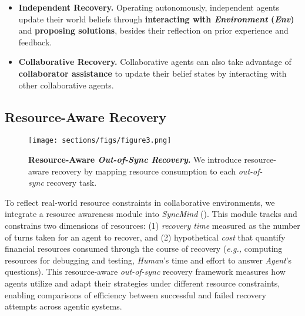 \begin{itemize}[noitemsep,topsep=0pt,parsep=2pt,partopsep=0pt,leftmargin=*]
    \item \textbf{Independent Recovery.} Operating autonomously, independent agents update their world beliefs through \textcolor{fig2_env}{\textbf{interacting with \textit{Environment} (\textit{Env})}} and  \textcolor{fig2_code}{\textbf{proposing solutions}}, besides their reflection on prior experience and feedback.
    \item \textbf{Collaborative Recovery.} Collaborative agents can also take advantage of \textcolor{fig2_ask}{\textbf{collaborator assistance}} to update their belief states by interacting with other collaborative agents. 
\end{itemize}



\subsection{Resource-Aware Recovery}
\label{Section: Resource Awareness Module}



\begin{figure}[H]
\begin{center}
\begin{small}
\vspace{-0.8em}
    \texttt{[image: sections/figs/figure3.png]}
    \vspace{-1.8em}
    \caption{\textbf{Resource-Aware \textit{Out-of-Sync Recovery}.} We introduce resource-aware recovery by mapping resource consumption to each \textit{out-of-sync} recovery task.}
    \vspace{-1.5em}
    \label{fig:figure 3 (resource awareness)}
\end{small}
\end{center}
\end{figure}



To reflect real-world resource constraints in collaborative environments, we integrate a resource awareness module into \textit{SyncMind} ().
% 
This module tracks and constrains two dimensions of resources: 
(1) \textit{recovery time} measured as the number of turns taken for an agent to recover, 
and (2) hypothetical \textit{cost} that quantify financial resources consumed through the course of recovery (\textit{e.g.,} computing resources for debugging and testing, \textcolor{fig1_human}{\textit{Human}}'s time and effort to answer \textcolor{fig1_agent}{\textit{Agent}}'s questions). 
%
%
This resource-aware \textit{out-of-sync} recovery framework measures how agents utilize and adapt their strategies under different resource constraints, enabling comparisons of efficiency between successful and failed recovery attempts across agentic systems.

